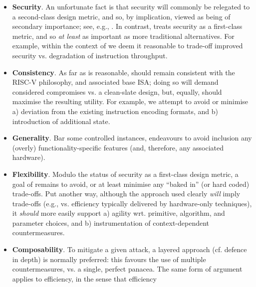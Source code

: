 \begin{itemize}
      \begin{itemize}
      \item {\bf         Security}.
            An unfortunate fact is that security will commonly be relegated 
            to a second-class design metric, and so, by implication, viewed 
            as being of secondary importance;
            see, e.g., \cite{SCARV:Lee:03,SCARV:RKLMR:03,SCARV:RRKH:04,SCARV:BurMutTiw:16}.
            In contrast, \XCID treats security as a first-class metric, and
            so {\em at least} as important as more traditional alternatives.
            For example,
            within the context of \XCID we deem it reasonable to trade-off 
            improved security vs. degradation of instruction throughput.
      \item {\bf      Consistency}.
            As far as is reasonable, \XCID should remain consistent with the
            RISC-V philosophy, and associated base ISA; doing so will demand 
            considered compromises vs. a clean-slate design, but, equally,
            should maximise the resulting utility.
            For example,
            we attempt to avoid or minimise 
            a) deviation from the existing instruction encoding formats,
               and 
            b) introduction of additional state.
      \item {\bf       Generality}.
            Bar some controlled instances, \XCID endeavours to avoid inclusion
            any (overly) functionality-specific features (and, therefore, any
            associated hardware).  
      \item {\bf      Flexibility}. 
            Modulo the status of security as a first-class design metric, a
            goal of \XCID remains to avoid, or at least minimise any ``baked 
            in'' (or hard coded) trade-offs.  Put another way, although the 
            approach used clearly {\em will} imply trade-offs 
            (e.g., vs. efficiency typically delivered by hardware-only techniques), 
            it {\em should} more easily support
            a) agility wrt. primitive, algorithm, and parameter choices,
               and
            b) instrumentation of context-dependent countermeasures.
      \item {\bf    Composability}.
            To mitigate a given attack, a layered approach (cf. defence in 
            depth) is normally preferred: this favours the use of multiple
            countermeasures, vs. a single, perfect panacea.  The same form
            of argument applies to efficiency, in the sense that efficiency 

\end{itemize}
\end{itemize}
